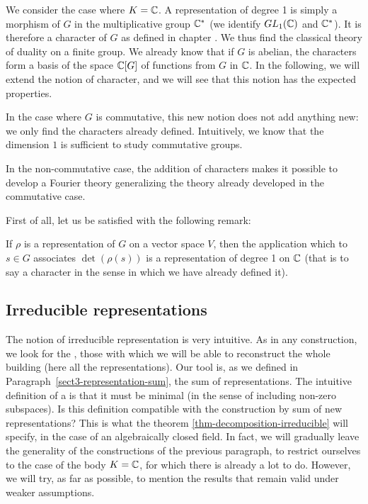  We consider the case where $ K = \mathbb{C} $. A representation of degree 1 is simply a morphism of $G$ in the multiplicative group $ \mathbb{C}^* $ (we identify $ GL_1 (\mathbb{C}) $ and $ \mathbb{C}^* $). It is therefore a character of $G$ as defined in chapter . We thus find the classical theory of duality on a finite group. We already know that if $G$ is abelian, the characters form a basis of the space $ \mathbb{C} [G] $ of functions from $G$ in $ \mathbb{C} $. In the following, we will extend the notion of character, and we will see that this notion has the expected properties. \begin{rs}
\item In the case where $G$ is commutative, this new notion does not add anything new: we only find the characters already defined. Intuitively, we know that the dimension $ 1 $ is sufficient to study commutative groups.
\item In the non-commutative case, the addition of  characters makes it possible to develop a Fourier theory generalizing the theory already developed in the commutative case.
\end{rs} First of all, let us be satisfied with the following remark:
 
\begin{rem}
 If $ \rho $ is a representation of $G$ on a vector space $V$, then the application which to $ s \in G $ associates $ \det (\rho (s)) $ is a representation of degree 1 on $ \mathbb{C} $ (that is to say a character in the sense in which we have already defined it).
\end{rem}
 
\subsection{Irreducible representations}
\label{sect2-representations-irreducibles}
 
 
The notion of irreducible representation is very intuitive. As in any construction, we look for the , those with which we will be able to reconstruct the whole building (here all the representations). Our tool is, as we defined in Paragraph~\ref{sect3-representation-sum}, the sum of representations. The intuitive definition of a  is that it must be minimal (in the sense of including non-zero subspaces). Is this definition compatible with the construction by sum of new representations? This is what the theorem \ref{thm-decomposition-irreducible} will specify, in the case of an algebraically closed field. In fact, we will gradually leave the generality of the constructions of the previous paragraph, to restrict ourselves to the case of the body $ K = \mathbb{C} $, for which there is already a lot to do. However, we will try, as far as possible, to mention the results that remain valid under weaker assumptions.
 
